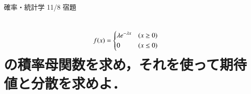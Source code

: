 \documentclass[a4paper,11pt]{bxjsarticle}
\begin{document}
\begin{center}
    \begin{LARGE}
        {\huge 確率・統計学 11/8 宿題}
    \end{LARGE}
\end{center}

\section{\[f(x)=\left\{
    \protect\begin{aligned}
        & \lambda e^{-\lambda x} &(x \geq 0)\\
        & 0                      &(x \leq 0)
    \protect\end{aligned}
    \right.\]
 の積率母関数を求め，それを使って期待値と分散を求めよ．}
\end{document}
